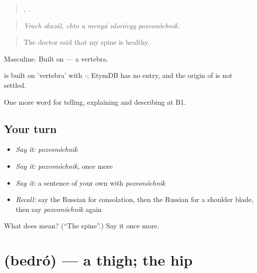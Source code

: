\begin{quote}
 ,     .
\end{quote}

\begin{quote}
\emph{Vrach skazál, chto u menyá zdoróvyy pozvonóchnik.}
\end{quote}

\begin{quote}
The doctor said that my spine is healthy.
\end{quote}

Masculine. Built on \emph{} — a vertebra.

\begin{cousinweb}
\emph{} is built on \emph{} 'vertebra' with \emph{-}; EtymDB has no entry, and the origin of \emph{} is not settled.
\end{cousinweb}

\begin{grammarlens}[title={What you've built}]
One more word for telling, explaining and describing at B1.
\end{grammarlens}

\subsection*{Your turn}
\begin{itemize}
\raggedright
  \item \emph{Say it:} \emph{pozvonóchnik}
  \item \emph{Say it:} \emph{pozvonóchnik}, once more
  \item \emph{Say it:} a sentence of your own with \emph{pozvonóchnik}
  \item \emph{Recall:} say the Russian for consolation, then the Russian for a shoulder blade, then say \emph{pozvonóchnik} again
\end{itemize}

\begin{tcolorbox}[breakable,colback=teal!4,colframe=teal!35!black,title={Before you move on}]
What does  mean? (\textquotedblleft{}The spine\textquotedblright{}.) Say it once more.
\end{tcolorbox}
\section[\texorpdfstring{\ru{бедро} (bedró)}{бедро (bedró)}]{ (bedró) — a thigh; the hip}

